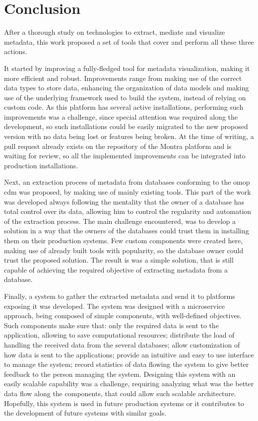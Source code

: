 
\chapter{Conclusion}
\label{chapter:conclusion}
After a thorough study on technologies to extract, mediate and visualize metadata, this work proposed a set of tools that cover and perform all these three actions.

It started by improving a fully-fledged tool for metadata visualization, making it more efficient and robust.
Improvements range from making use of the correct data types to store data, enhancing the organization of data models and making use of the underlying framework used to build the system, instead of relying on custom code.
As this platform has several active installations, performing such improvements was a challenge, since special attention was required along the development, so such installations could be easily migrated to the new proposed version with no data being lost or features being broken.
At the time of writing, a pull request already exists on the repository of the Montra platform and is waiting for review, so all the implemented improvements can be integrated into production installations.

Next, an extraction process of metadata from databases conforming to the \gls{omop} \gls{cdm} was proposed, by making use of mainly existing tools.
This part of the work was developed always following the mentality that the owner of a database has total control over its data, allowing him to control the regularity and automation of the extraction process.
The main challenge encountered, was to develop a solution in a way that the owners of the databases could trust them in installing them on their production systems.
Few custom components were created here, making use of already built tools with popularity, so the database owner could trust the proposed solution.
The result is was a simple solution, that is still capable of achieving the required objective of extracting metadata from a database.

Finally, a system to gather the extracted metadata and send it to platforms exposing it was developed.
The system was designed with a microservice approach, being composed of simple components, with well-defined objectives.
Such components make sure that: only the required data is sent to the application, allowing to save computational resources; distribute the load of handling the received data from the several databases; allow customization of how data is sent to the applications; provide an intuitive and easy to use interface to manage the system; record statistics of data flowing the system to give better feedback to the person managing the system.
Designing this system with an easily scalable capability was a challenge, requiring analyzing what was the better data flow along the components, that could allow such scalable architecture.
Hopefully, this system is used in future production systems or it contributes to the development of future systems with similar goals.

